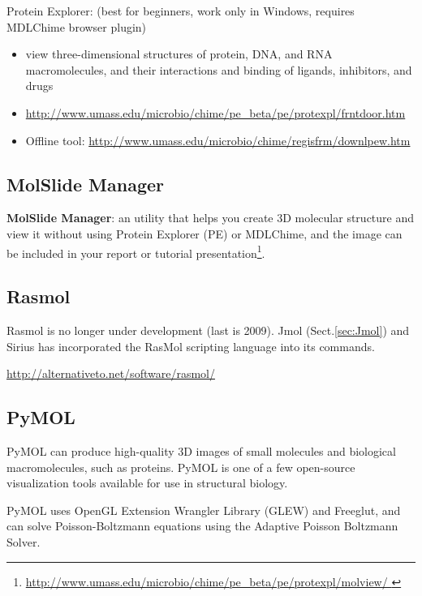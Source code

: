 Protein Explorer: (best for beginners, work only in Windows, requires MDLChime browser plugin) 
\begin{itemize}
  
\item view three-dimensional structures of protein, DNA, and RNA
  macromolecules, and their interactions and binding of ligands,
  inhibitors, and drugs

\item \url{ http://www.umass.edu/microbio/chime/pe_beta/pe/protexpl/frntdoor.htm}

\item Offline tool:
\url{http://www.umass.edu/microbio/chime/regisfrm/downlpew.htm}

\end{itemize}

\subsection{MolSlide Manager}
\label{sec:MolSlide-Manager}

{\bf MolSlide Manager}: an utility that helps you create 3D molecular structure
and view it without using Protein Explorer (PE) or MDLChime, and the image can
be included in your report or tutorial
presentation\footnote{\url{http://www.umass.edu/microbio/chime/pe_beta/pe/protexpl/molview/
}}.

\subsection{Rasmol}
\label{sec:Rasmol}

Rasmol is no longer under development (last is 2009). Jmol
(Sect.\ref{sec:Jmol}) and Sirius has incorporated the RasMol scripting language
into its commands.

\url{http://alternativeto.net/software/rasmol/}



\subsection{PyMOL}
\label{sec:PyMol}

PyMOL can produce high-quality 3D images of small molecules and biological
macromolecules, such as proteins. PyMOL is one of a few open-source
visualization tools available for use in structural biology.

PyMOL uses OpenGL Extension Wrangler Library (GLEW) and Freeglut, and can solve
Poisson-Boltzmann equations using the Adaptive Poisson
Boltzmann Solver.


